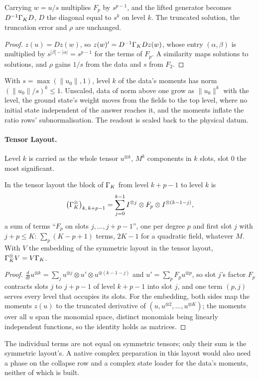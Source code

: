 \begin{proposition}
\label{prop:level-scale}
Carrying $w=u/s$ multiplies $F_p$ by $s^{p-1}$, and the lifted generator becomes $D^{-1}\Gamma_KD$, $D$ the diagonal equal to $s^k$ on level $k$. The truncated solution, the truncation error and $\rho$ are unchanged.
\end{proposition}
\begin{proof}
$z(u)=Dz(w)$, so $z(w)'=D^{-1}\Gamma_KDz(w)$, whose entry $(\alpha,\beta)$ is multiplied by $s^{|\beta|-|\alpha|}=s^{p-1}$ for the terms of $F_p$. A similarity maps solutions to solutions, and $\rho$ gains $1/s$ from the data and $s$ from $F_2$.
\end{proof}
With $s=\max(\|u_0\|,1)$, level $k$ of the data's moments has norm $(\|u_0\|/s)^k\le1$. Unscaled, data of norm above one grow as $\|u_0\|^k$ with the level, the ground state's weight moves from the fields to the top level, where no initial state independent of the answer reaches it, and the moments inflate the ratio rows' subnormalisation. The readout is scaled back to the physical datum.

\paragraph{Tensor Layout.} Level $k$ is carried as the whole tensor $u^{\otimes k}$, $M^k$ components in $k$ slots, slot $0$ the most significant.

\begin{proposition}
\label{prop:tensor-terms}
In the tensor layout the block of $\Gamma_K$ from level $k+p-1$ to level $k$ is
\begin{equation}
    \bigl(\Gamma^{\otimes}_K\bigr)_{k,\,k+p-1}=\sum_{j=0}^{k-1}I^{\otimes j}\otimes F_p\otimes I^{\otimes(k-1-j)},
\end{equation}
a sum of terms ``$F_p$ on slots $j,\dots,j+p-1$'', one per degree $p$ and first slot $j$ with $j+p\le K$: $\sum_p(K-p+1)$ terms, $2K-1$ for a quadratic field, whatever $M$. With $V$ the embedding of the symmetric layout in the tensor layout, $\Gamma^\otimes_KV=V\Gamma_K$.
\end{proposition}
\begin{proof}
$\frac{d}{dt}u^{\otimes k}=\sum_ju^{\otimes j}\otimes u'\otimes u^{\otimes(k-1-j)}$ and $u'=\sum_pF_pu^{\otimes p}$, so slot $j$'s factor $F_p$ contracts slots $j$ to $j+p-1$ of level $k+p-1$ into slot $j$, and one term $(p,j)$ serves every level that occupies its slots. For the embedding, both sides map the moments $z(u)$ to the truncated derivative of $(u,u^{\otimes2},\dots,u^{\otimes K})$; the moments over all $u$ span the monomial space, distinct monomials being linearly independent functions, so the identity holds as matrices.
\end{proof}
The individual terms are not equal on symmetric tensors; only their sum is the symmetric layout's. A native complex preparation in this layout would also need a phase on the collapse row and a complex state loader for the data's moments, neither of which is built.

